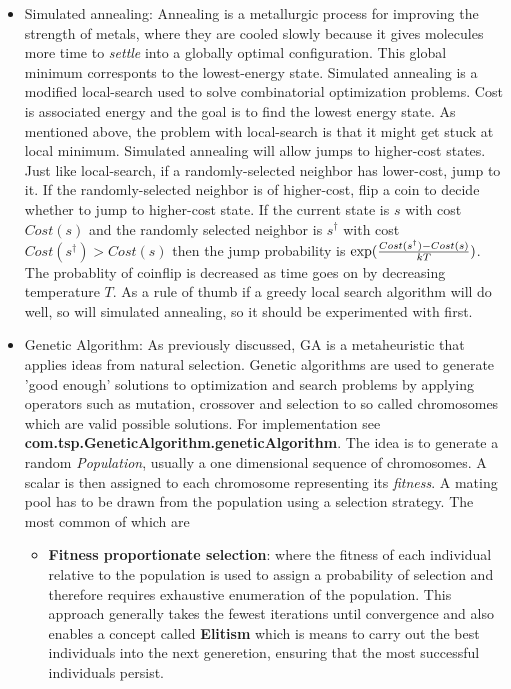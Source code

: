 \documentclass[11pt]{article}
\begin{document}
\begin{itemize}
\item Simulated annealing\cite{annealing}: Annealing is a metallurgic process for improving the strength of metals, where they are cooled slowly because it gives molecules more time to \textit{settle} into a globally optimal configuration. This global minimum corresponts to the lowest-energy state. Simulated annealing is a modified local-search used to solve combinatorial optimization problems. Cost is associated energy and the goal is to find the lowest energy state. As mentioned above, the problem with local-search is that it might get stuck at local minimum. Simulated annealing will allow jumps to higher-cost states. Just like local-search, if a randomly-selected neighbor has lower-cost, jump to it. If the randomly-selected neighbor is of higher-cost, flip a coin to decide whether to jump to higher-cost state. If the current state is $s$ with cost $Cost(s)$ and the randomly selected neighbor is $s^\dagger$ with cost $Cost(s^\dagger) > Cost(s)$ then the jump probability is $\textup{exp}(\frac{Cost(s^\dagger) - Cost(s)}{kT})$. The probablity of coinflip is decreased as time goes on by decreasing temperature $T$. As a rule of thumb if a greedy local search algorithm will do well, so will simulated annealing, so it should be experimented with first.
\item Genetic Algorithm: As previously discussed, GA is a metaheuristic that applies ideas from natural selection. Genetic algorithms are used to generate 'good enough' solutions to optimization and search problems by applying operators such as mutation, crossover and selection to so called chromosomes which are valid possible solutions. For implementation see \textbf{com.tsp.GeneticAlgorithm.geneticAlgorithm}. The idea is to generate a random \textit{Population}, usually a one dimensional sequence of chromosomes. A scalar is then assigned to each chromosome representing its \textit{fitness}. A mating pool has to be drawn from the population using a selection strategy. The most common of which are 
\begin{itemize}
\item \textbf{Fitness proportionate selection}: where the fitness of each individual relative to the population is used to assign a probability of selection and therefore requires exhaustive enumeration of the population. This approach generally takes the fewest iterations until convergence and also enables a concept called \textbf{Elitism} which is means to carry out the best individuals into the next generetion, ensuring that the most successful individuals persist.

\end{itemize}
\end{itemize}
\end{document}
